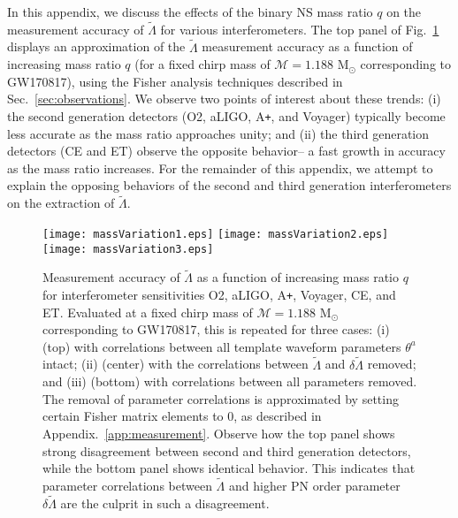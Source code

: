 \documentclass[prd,twocolumn,nofootinbib,superscriptaddress,amsmath,amssymb]{revtex4-1}
\begin{document}
In this appendix, we discuss the effects of the binary NS mass ratio $q$ on the measurement accuracy of $\tilde\Lambda$ for various interferometers. 
The top panel of Fig.~\ref{fig:massVariation} displays an approximation of the $\tilde\Lambda$ measurement accuracy as a function of increasing mass ratio $q$ (for a fixed chirp mass of $\mathcal{M}=1.188 \text{ M}_{\odot}$ corresponding to GW170817), using the Fisher analysis techniques described in Sec.~\ref{sec:observations}.
We observe two points of interest about these trends: (i) the second generation detectors (O2, aLIGO, A\texttt{+}, and Voyager) typically become less accurate as the mass ratio approaches unity; and (ii) the third generation detectors (CE and ET) observe the opposite behavior-- a fast growth in accuracy as the mass ratio increases.
For the remainder of this appendix, we attempt to explain the opposing behaviors of the second and third generation interferometers on the extraction of $\tilde\Lambda$.

\begin{figure}
\begin{center} 
\texttt{[image: massVariation1.eps]}
\texttt{[image: massVariation2.eps]}
\texttt{[image: massVariation3.eps]}
\end{center}
\caption{
Measurement accuracy of $\tilde\Lambda$ as a function of increasing mass ratio $q$ for interferometer sensitivities O2, aLIGO, A\texttt{+}, Voyager, CE, and ET.
Evaluated at a fixed chirp mass of $\mathcal{M}=1.188\text{ M}_{\odot}$ corresponding to GW170817, this is repeated for three cases: (i) (top) with correlations between all template waveform parameters $\theta^a$ intact; (ii) (center) with the correlations between $\tilde\Lambda$ and $\delta\tilde\Lambda$ removed; and (iii) (bottom) with correlations between all parameters removed.
The removal of parameter correlations is approximated by setting certain Fisher matrix elements to 0, as described in Appendix.~\ref{app:measurement}.
Observe how the top panel shows strong disagreement between second and third generation detectors, while the bottom panel shows identical behavior.
This indicates that parameter correlations between $\tilde\Lambda$ and higher PN order parameter $\delta\tilde\Lambda$ are the culprit in such a disagreement.
}
\label{fig:massVariation}
\end{figure} 
\end{document}

